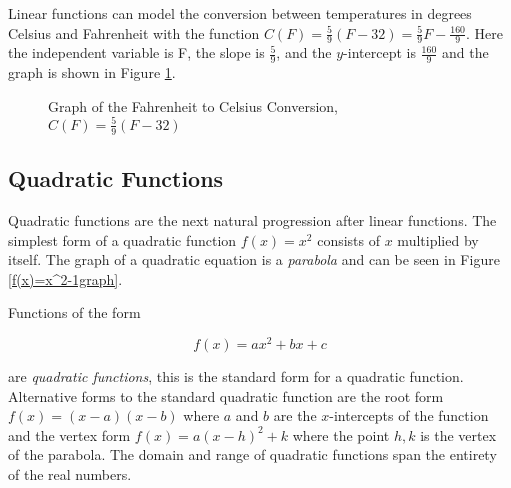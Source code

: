 \begin{example}
    Linear functions can model the conversion between temperatures in degrees Celsius and Fahrenheit with the function $C(F) = \frac{5}{9}(F - 32) = \frac{5}{9}F - \frac{160}{9}$. Here the independent variable is F, the slope is $\frac{5}{9}$, and the $y$-intercept is $\frac{160}{9}$ and the graph is shown in Figure \ref{FtoCgraph}.

    \begin{figure}[!ht]
        \centering
        \label{FtoCgraph}
        \caption{Graph of the Fahrenheit to Celsius Conversion, $C(F) = \frac{5}{9}(F-32)$}
    \end{figure}
\end{example}


\subsection{Quadratic Functions}
Quadratic functions are the next natural progression after linear functions. The simplest form of a quadratic function $f(x) = x^2$ consists of $x$ multiplied by itself. The graph of a quadratic equation is a \textit{parabola} and can be seen in Figure \ref{f(x)=x^2-1graph}.

\begin{definition}
    Functions of the form

    \begin{equation}
        f(x) = ax^2 + bx + c
    \end{equation}

    \noindent are \textit{quadratic functions}, this is the standard form for a quadratic function. Alternative forms to the standard quadratic function are the root form $f(x) = (x-a)(x-b)$ where $a$ and $b$ are the $x$-intercepts of the function and the vertex form $f(x) = a(x-h)^2+k$ where the point $h,k$ is the vertex of the parabola. The domain and range of quadratic functions span the entirety of the real numbers.
\end{definition}


